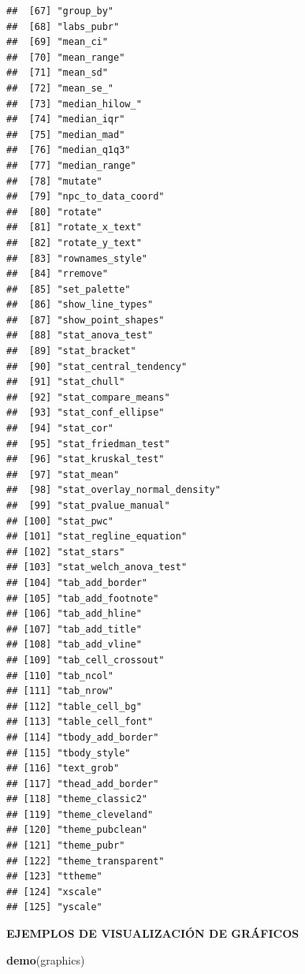 \documentclass[
]{book}
\newenvironment{Shaded}{\begin{snugshade}}{\end{snugshade}}
\newcommand{\FunctionTok}[1]{\textcolor[rgb]{0.13,0.29,0.53}{\textbf{#1}}}
\newcommand{\NormalTok}[1]{#1}
\begin{document}
\begin{verbatim}
##  [67] "group_by"                   
##  [68] "labs_pubr"                  
##  [69] "mean_ci"                    
##  [70] "mean_range"                 
##  [71] "mean_sd"                    
##  [72] "mean_se_"                   
##  [73] "median_hilow_"              
##  [74] "median_iqr"                 
##  [75] "median_mad"                 
##  [76] "median_q1q3"                
##  [77] "median_range"               
##  [78] "mutate"                     
##  [79] "npc_to_data_coord"          
##  [80] "rotate"                     
##  [81] "rotate_x_text"              
##  [82] "rotate_y_text"              
##  [83] "rownames_style"             
##  [84] "rremove"                    
##  [85] "set_palette"                
##  [86] "show_line_types"            
##  [87] "show_point_shapes"          
##  [88] "stat_anova_test"            
##  [89] "stat_bracket"               
##  [90] "stat_central_tendency"      
##  [91] "stat_chull"                 
##  [92] "stat_compare_means"         
##  [93] "stat_conf_ellipse"          
##  [94] "stat_cor"                   
##  [95] "stat_friedman_test"         
##  [96] "stat_kruskal_test"          
##  [97] "stat_mean"                  
##  [98] "stat_overlay_normal_density"
##  [99] "stat_pvalue_manual"         
## [100] "stat_pwc"                   
## [101] "stat_regline_equation"      
## [102] "stat_stars"                 
## [103] "stat_welch_anova_test"      
## [104] "tab_add_border"             
## [105] "tab_add_footnote"           
## [106] "tab_add_hline"              
## [107] "tab_add_title"              
## [108] "tab_add_vline"              
## [109] "tab_cell_crossout"          
## [110] "tab_ncol"                   
## [111] "tab_nrow"                   
## [112] "table_cell_bg"              
## [113] "table_cell_font"            
## [114] "tbody_add_border"           
## [115] "tbody_style"                
## [116] "text_grob"                  
## [117] "thead_add_border"           
## [118] "theme_classic2"             
## [119] "theme_cleveland"            
## [120] "theme_pubclean"             
## [121] "theme_pubr"                 
## [122] "theme_transparent"          
## [123] "ttheme"                     
## [124] "xscale"                     
## [125] "yscale"
\end{verbatim}

\textbf{EJEMPLOS DE VISUALIZACIÓN DE GRÁFICOS}

\begin{Shaded}
\begin{Highlighting}[]
\FunctionTok{demo}\NormalTok{(graphics)}
\end{Highlighting}
\end{Shaded}
\end{document}
